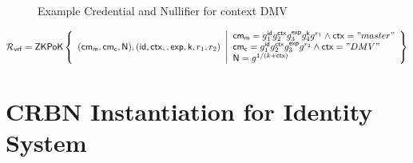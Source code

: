 \begin{figure}
        \begin{pchstack}[boxed, center, space=4em]
            \begin{pcvstack}
            \end{pcvstack}
            \pcvspace
            \begin{pcvstack}
            \end{pcvstack}
            \begin{pcvstack}
            \end{pcvstack}
        \end{pchstack}
    \caption{Example Credential and Nullifier for context DMV}
    \label{fig:two-creds}
\end{figure}


\[
    \mathcal{R}_{\mathsf{vrf}} = {\mathsf{ZKPoK}} \left\{ 
    \begin{array}{l} 
    (\mathsf{cm_m}, \mathsf{cm_c}, \mathsf{N}), (\mathsf{id}, \mathsf{ctx}, , \mathsf{exp}, \mathsf{k}, r_1, r_2) \\
    \end{array} 
    \middle|
    \begin{array}{l}
        \mathsf{cm_m} = g_1^{\mathsf{id}}g_2^{\mathsf{ctx}}g_3^{\mathsf{exp}}g_4^{\mathsf{k}}g^{r_1}  \wedge \mathsf{ctx}="master" \\
        \mathsf{cm_c} = g_1^{\mathsf{id}}g_2^{\mathsf{ctx}}g_3^{\mathsf{exp}}g^{r_2} \wedge \mathsf{ctx}="DMV" \\
        \mathsf{N} = g^{1/(k + \mathsf{ctx})}
    \end{array} 
    \right\}
\]
    



\section{CRBN Instantiation for Identity System}

